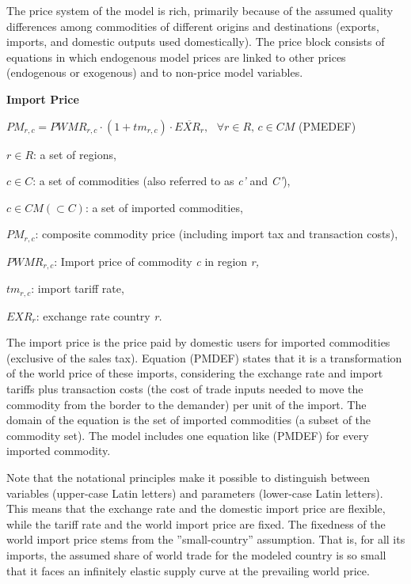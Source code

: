 \documentclass[10pt,a4paper,titlepage,dvipdfmx]{book}
\begin{document}
 The price system of the model is rich, primarily because of the assumed quality differences among commodities of different origins and destinations (exports, imports, and domestic outputs used domestically). The price block consists of equations in which endogenous model prices are linked to other prices (endogenous or exogenous) and to non-price model variables.

\begin{flushleft}\textbf{Import Price }\end{flushleft}

\begin{center}$PM_{r,c}=PWMR_{r,c}\cdot \left(1+tm_{r,c}\right)\cdot \overline{EXR_{r}},\,\,\,\,\forall r\in R,\,c\in CM$ (PMEDEF)
\end{center}

\begin{flushleft}
$r\in R$: a set of regions,

$c\in C$: a set of commodities (also referred to as \textit{c'} and \textit{C'}),

$c\in CM\left(\subset C\right)$: a set of imported commodities,

$PM_{r,c}$: composite commodity price (including import tax and transaction costs),

$PWMR_{r,c}$: Import price of commodity \textit{c} in region \textit{r,}

$tm_{r,c}$: import tariff rate,

$EXR_{r}$: exchange rate country \textit{r.}
\end{flushleft}

The import price is the price paid by domestic users for imported commodities (exclusive of the sales tax). Equation (PMDEF) states that it is a transformation of the world price of these imports, considering the exchange rate and import tariffs plus transaction costs (the cost of trade inputs needed to move the commodity from the border to the demander) per unit of the import. The domain of the equation is the set of imported commodities (a subset of the commodity set). The model includes one equation like (PMDEF) for every imported commodity.

Note that the notational principles make it possible to distinguish between variables (upper-case Latin letters) and parameters (lower-case Latin letters). This means that the exchange rate and the domestic import price are flexible, while the tariff rate and the world import price are fixed. The fixedness of the world import price stems from the ''small-country'' assumption. That is, for all its imports, the assumed share of world trade for the modeled country is so small that it faces an infinitely elastic supply curve at the prevailing world price.
\end{document}
